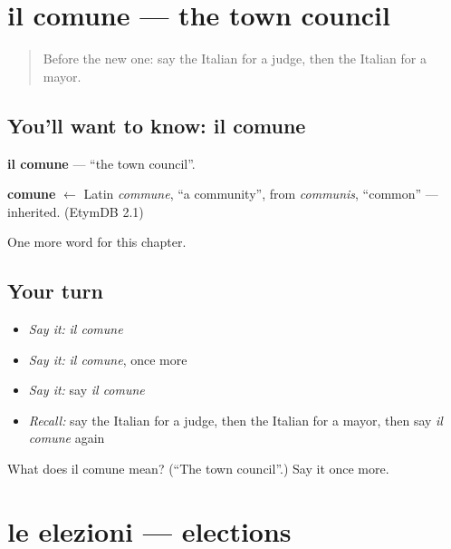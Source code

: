\section[il comune]{il comune — the town council}

\label{lesson:IT-C161-comune}



\begin{quote}
Before the new one: say the Italian for a judge, then the Italian for a mayor.
\end{quote}

\subsection*{You'll want to know: il comune}
\textbf{il comune} — \textquotedblleft{}the town council\textquotedblright{}.

\begin{cousinweb}
\textbf{comune} $\leftarrow$ Latin \emph{commune}, \textquotedblleft{}a community\textquotedblright{}, from \emph{communis}, \textquotedblleft{}common\textquotedblright{} — inherited. (EtymDB 2.1)
\end{cousinweb}

\begin{grammarlens}[title={What you've built}]
One more word for this chapter.
\end{grammarlens}

\subsection*{Your turn}
\begin{itemize}
\raggedright
  \item \emph{Say it:} \emph{il comune}
  \item \emph{Say it:} \emph{il comune}, once more
  \item \emph{Say it:} say \emph{il comune}
  \item \emph{Recall:} say the Italian for a judge, then the Italian for a mayor, then say \emph{il comune} again
\end{itemize}

\begin{tcolorbox}[breakable,colback=teal!4,colframe=teal!35!black,title={Before you move on}]
What does il comune mean? (\textquotedblleft{}The town council\textquotedblright{}.) Say it once more.
\end{tcolorbox}
\section[le elezioni]{le elezioni — elections}

